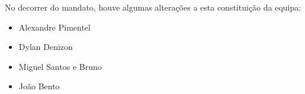 No decorrer do mandato, houve algumas alterações a esta constituição da equipa:
\begin{itemize}

\item Alexandre Pimentel
\item Dylan Denizon
\item Miguel Santos e Bruno
\item João Bento

\end{itemize}

